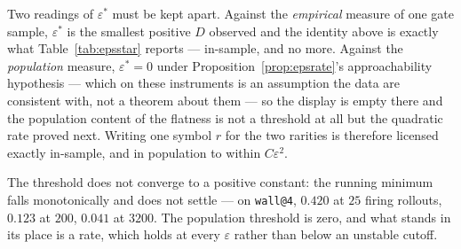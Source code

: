 \documentclass[11pt]{article}
\theoremstyle{definition}
\theoremstyle{remark}
\begin{document}
Two readings of $\varepsilon^\ast$ must be kept apart. Against the \emph{empirical} measure of one gate sample, $\varepsilon^\ast$ is the smallest positive $D$ observed and the identity above is exactly what Table~\ref{tab:epsstar} reports --- in-sample, and no more. Against the \emph{population} measure, $\varepsilon^\ast = 0$ under Proposition~\ref{prop:epsrate}'s approachability hypothesis --- which on these instruments is an assumption the data are consistent with, not a theorem about them --- so the display is empty there and the population content of the flatness is not a threshold at all but the quadratic rate proved next. Writing one symbol $r$ for the two rarities is therefore licensed exactly in-sample, and in population to within $C\varepsilon^2$.

The threshold does not converge to a positive constant: the running minimum falls monotonically and does not settle --- on \texttt{wall@4}, $0.420$ at $25$ firing rollouts, $0.123$ at $200$, $0.041$ at $3200$. The population threshold is zero, and what stands in its place is a rate, which holds at every $\varepsilon$ rather than below an unstable cutoff.
\end{document}
